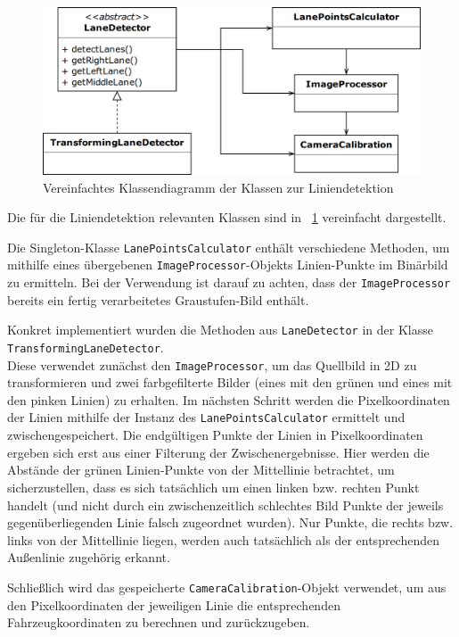 \begin{figure}[h]
	\centering
	\includegraphics[width = 1.0\textwidth]{images/LaneDetectionKlassendiagramm.png}
	\caption{Vereinfachtes Klassendiagramm der Klassen zur Liniendetektion}
	\label{fig:lanedetection}
\end{figure}

Die f\"ur die Liniendetektion relevanten Klassen sind in \figurename\ \ref{fig:lanedetection} vereinfacht
dargestellt.

Die Singleton-Klasse \texttt{LanePointsCalculator} enth\"alt verschiedene Methoden, um mithilfe eines
\"ubergebenen \texttt{ImageProcessor}-Objekts Linien-Punkte im Bin\"arbild zu ermitteln. Bei der
Verwendung ist darauf zu achten, dass der \texttt{ImageProcessor} bereits ein fertig verarbeitetes
Graustufen-Bild enth\"alt.

Konkret implementiert wurden die Methoden aus \texttt{LaneDetector} in der Klasse
\texttt{TransformingLaneDetector}.\\
Diese verwendet zun\"achst den \texttt{ImageProcessor}, um das Quellbild in 2D zu transformieren und zwei
farbgefilterte Bilder (eines mit den gr\"unen und eines mit den pinken Linien) zu erhalten. Im n\"achsten
Schritt werden die Pixelkoordinaten der Linien mithilfe der Instanz des \texttt{LanePointsCalculator}
ermittelt und zwischengespeichert. Die endg\"ultigen Punkte der Linien in Pixelkoordinaten ergeben sich
erst aus einer Filterung der Zwischenergebnisse. Hier werden die Abst\"ande der gr\"unen Linien-Punkte
von der Mittellinie betrachtet, um sicherzustellen, dass es sich tats\"achlich um einen linken bzw.
rechten Punkt handelt (und nicht durch ein zwischenzeitlich schlechtes Bild Punkte der jeweils
gegen\"uberliegenden Linie falsch zugeordnet wurden). Nur Punkte, die rechts bzw. links von der
Mittellinie liegen, werden auch tats\"achlich als der entsprechenden Au\ss enlinie zugeh\"orig erkannt.

Schlie\ss lich wird das gespeicherte \texttt{CameraCalibration}-Objekt verwendet, um aus den Pixelkoordinaten
der jeweiligen Linie die entsprechenden Fahrzeugkoordinaten zu berechnen und zur\"uckzugeben.\\

